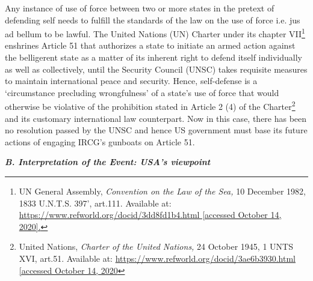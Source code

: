 \begin{multicols}{2}
\noi
Any instance of use of force between two or more states in the pretext of defending self
needs to fulfill the standards of the law on the use of force i.e. jus ad bellum to be lawful.
The United Nations (UN) Charter under its chapter VII\footnote{UN General Assembly, \textit{Convention on the Law of the Sea,} 10 December 1982, 1833 U.N.T.S. 397’, art.111. Available at: \url{https://www.refworld.org/docid/3dd8fd1b4.html [accessed October 14, 2020].}}  enshrines Article 51 that authorizes
a state to initiate an armed action against the belligerent state as a matter of its inherent right
to defend itself individually as well as collectively, until the Security Council (UNSC) takes
requisite measures to maintain international peace and security. Hence, self-defense is a
‘circumstance precluding wrongfulness’ of a state’s use of force that would otherwise be
violative of the prohibition stated in Article 2 (4) of the Charter\footnote{United Nations, \textit{Charter of the United Nations,} 24 October 1945, 1 UNTS XVI, art.51. Available at: \url{https://www.refworld.org/docid/3ae6b3930.html [accessed October 14, 2020}} and its customary
international law counterpart. Now in this case, there has been no resolution passed by the UNSC and hence US government must base its future actions of engaging IRCG’s gunboats
on Article 51.

\noi
\textbf{\textit{B. Interpretation of the Event: USA’s viewpoint}}


\end{multicols}
